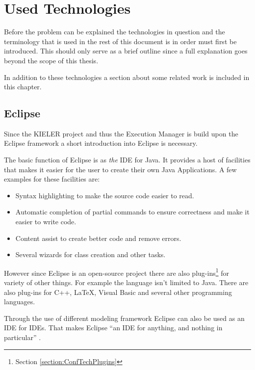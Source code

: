 \chapter{Used Technologies}
\label{chapter:ConfTechnology}
Before the problem can be explained the technologies in question
and the terminology that is used in the rest of this document is in order must first be introduced. This should
only serve as a brief outline since a full explanation goes beyond the scope of this thesis.

In addition to these technologies a section about some related work is included in this chapter.

\section{Eclipse}
\label{section:ConfTechEclipse}
Since the \ac{KIELER} project and thus the Execution Manager is build upon the 
Eclipse framework a short introduction into Eclipse is necessary.

The basic function of Eclipse is as \textit{the} \ac{IDE} for Java. It provides
a host of facilities that makes it easier for the user to create their own Java Applications.
A few examples for these facilities are:
\begin{itemize}
 \item Syntax highlighting to make the source code easier to read.
 \item Automatic completion of partial commands to ensure correctness
and make it easier to write code.
 \item Content assist to create better code and remove errors.
 \item Several wizards for class creation and other tasks.
\end{itemize}

However since Eclipse is an open-source project there are also plug-ins\footnote{Section 
\ref{section:ConfTechPlugins}} for variety of other things. 
For example the language isn't limited to Java. There are also plug-ins
for C++, \LaTeX, Visual Basic and several other programming languages.

Through the use of different modeling framework Eclipse can also be used as an \ac{IDE}
for \ac{IDE}s. That makes Eclipse ``an IDE for anything, and nothing in particular'' \cite{eclipseOverview}.


